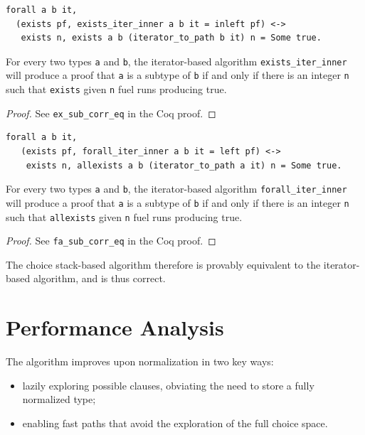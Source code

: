 \documentclass[a4paper,english]{lipics-v2019}
\begin{document}
\begin{lemma}
\begin{small}\begin{verbatim}
forall a b it, 
  (exists pf, exists_iter_inner a b it = inleft pf) <->
   exists n, exists a b (iterator_to_path b it) n = Some true.
\end{verbatim}\end{small}
For every two types \verb|a| and \verb|b|, the iterator-based algorithm
\verb|exists_iter_inner| will produce a proof that \verb|a| is a subtype
of \verb|b| if and only if there is an integer \verb|n| such that
 \verb|exists| given \verb|n| fuel runs producing true.
\end{lemma}
\begin{proof}
See \verb|ex_sub_corr_eq| in the Coq proof.
\end{proof}

\begin{lemma}
\begin{small}\begin{verbatim}
forall a b it,
   (exists pf, forall_iter_inner a b it = left pf) <->
    exists n, allexists a b (iterator_to_path a it) n = Some true.
\end{verbatim}
\end{small}  
For every two types \verb|a| and \verb|b|, the iterator-based algorithm
\verb|forall_iter_inner| will produce a proof that \verb|a| is a subtype
of \verb|b| if and only if there is an integer \verb|n| such that
 \verb|allexists| given \verb|n| fuel runs producing true.
\end{lemma}
\begin{proof}
See \verb|fa_sub_corr_eq| in the Coq proof.
\end{proof}

The choice stack-based algorithm therefore is provably equivalent to the
iterator-based algorithm, and is thus correct.

\section{Performance Analysis}

The algorithm improves upon normalization in two key ways:
\begin{itemize}
  \item lazily exploring possible clauses, obviating the need to store a
    fully normalized type;
  \item enabling fast paths that avoid the exploration of the full choice space.
\end{itemize}
\end{document}

